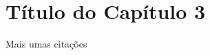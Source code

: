 \chapter{Título do Capítulo 3}
\label{cap3}

Mais umas citações \cite{AndroidDoc, Chen1976}

\lipsum


